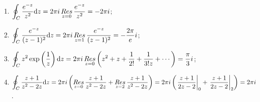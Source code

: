 \begin{questions}
%
\begin{solution}
    \begin{enumerate}[label=(\alph*)]
      \item $\displaystyle \oint_C \frac{e^{-z}}{z^2} \mathrm{d} z = 2\pi i \mathop{Res}\limits_{z=0} \frac{e^{-z}}{z^2} = -2 \pi i$;
      \item $\displaystyle \oint_C \frac{e^{-z}}{(z-1)^2} \mathrm{d} z = 2\pi i \mathop{Res}\limits_{z=1} \frac{e^{-z}}{(z-1)^2} = -\frac{2\pi}{e} i$;
      \item $\displaystyle \oint_C z^2 \exp\left(\frac{1}{z}\right) \mathrm{d} z = 2\pi i \mathop{Res}\limits_{z=0} \left(z^2 + z + \frac{1}{2!} + \frac{1}{3! z} + \cdots \right) = \frac{\pi}{3} i$;
      \item $\displaystyle \oint_C \frac{z+1}{z^2 - 2z} \mathrm{d} z = 2\pi i\left( \mathop{Res}\limits_{z=0} \frac{z+1}{z^2 - 2z} + \mathop{Res}\limits_{z=2}\frac{z+1}{z^2 - 2z} \right) = 2\pi i\left( \left.\frac{z+1}{2z - 2}\right|_{0} + \left.\frac{z+1}{2z - 2}\right|_{2} \right) = 2\pi i$.
   \end{enumerate}
\end{solution}


\end{questions}
